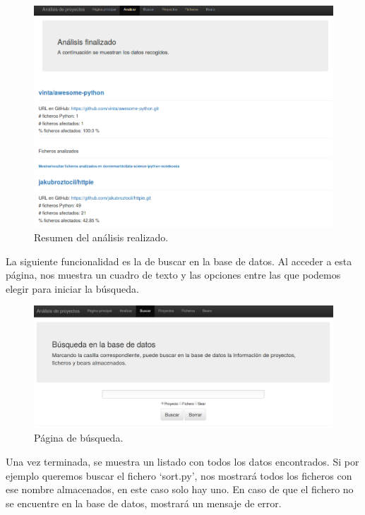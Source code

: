 \documentclass[a4paper, 12pt]{book}
\begin{document}
\begin{figure}[H]
  \centering
  \includegraphics[width=12cm, keepaspectratio]{img/resumenAnalisis}
  \caption{Resumen del análisis realizado.}
  \label{fig:resumenAnalisis}
\end{figure}

La siguiente funcionalidad es la de buscar en la base de datos. Al acceder a esta página, nos muestra un cuadro de texto y las opciones entre las que podemos elegir para iniciar la búsqueda.

\begin{figure}[H]
  \centering
  \includegraphics[width=15cm, keepaspectratio]{img/webBuscar}
  \caption{Página de búsqueda.}
  \label{fig:webBuscar}
\end{figure}

Una vez terminada, se muestra un listado con todos los datos encontrados. Si por ejemplo queremos buscar el fichero `sort.py', nos mostrará todos los ficheros con ese nombre almacenados, en este caso solo hay uno. En caso de que el fichero no se encuentre en la base de datos, mostrará un mensaje de error.
\end{document}
